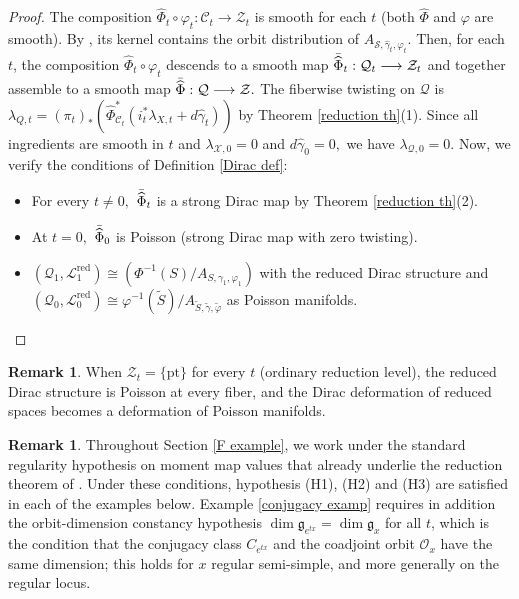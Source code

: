 \documentclass[reqno]{amsart}
\theoremstyle{plain}
\theoremstyle{definition}
\newtheorem{Rem}[Thm]{Remark}
\newcommand{\too}{\longrightarrow}
\newcommand{\C}{\mathcal{C}}
\renewcommand{\S}{\mathcal{S}}
\renewcommand{\L}{\mathcal{L}}
\newcommand{\Z}{\mathcal{Z}}
\newcommand{\X}{\mathcal{X}}
\newcommand{\Q}{\mathcal{Q}}
\begin{document}
\begin{proof}
The composition $\widehat{\Phi}_t \circ \varphi_t: \C_t \too \Z_t$ is smooth for each $t$ (both $\widehat{\Phi}$ and $\varphi$ are smooth). By \cite[]{bualibanu2026reduction}, its kernel contains the orbit distribution of $A_{\S,\widehat{\gamma}_t,\varphi_t}.$ Then, for each $t$, the composition $\widehat{\Phi}_t \circ \varphi_t$ descends to a smooth map $\Bar{\widehat{\Phi}}_t: \Q_t \too \Z_t$ and together assemble to a smooth map $\Bar{\widehat{\Phi}}: \Q \too \Z.$ 
The fiberwise twisting on $\Q$ is $\lambda_{Q,t} = (\pi_{t})_*(\widehat{\Phi}^{*}_{\C_t}(i_{t}^{*} \lambda_{X,t} + d\widehat{\gamma}_t))$ by Theorem \ref{reduction th}(1). Since all ingredients are smooth in $t$ and $\lambda_{\X,0} = 0$ and $d\widehat{\gamma}_0 = 0,$ we have $\lambda_{\Q,0} = 0.$ Now, we verify the conditions of Definition \ref{Dirac def}: \begin{itemize}
    \item For every $t\neq 0,$ $\Bar{\widehat{\Phi}}_t$ is a strong Dirac map by Theorem \ref{reduction th}(2). 
    \item At $t = 0,$ $\Bar{\widehat{\Phi}}_0$ is Poisson (strong Dirac map with zero twisting).
    \item $(\Q_1,\L^{\text{red}}_1) \cong (\Phi^{-1}(S)/A_{S,\gamma_1,\varphi_1})$ with the reduced Dirac structure and $(\Q_0,\L^{\text{red}}_0) \cong \varphi^{-1}(\widetilde{S})/A_{\widetilde{S},\tilde{\gamma},\tilde{\varphi}}$ as Poisson manifolds.
\end{itemize}
\end{proof}


\begin{Rem}
When $\Z_t = \{\text{pt}\}$ for every $t$ (ordinary reduction level), the reduced Dirac structure is Poisson at every fiber, and the Dirac deformation of reduced spaces becomes a deformation of Poisson manifolds. 
\end{Rem}

\begin{Rem}
    Throughout Section \ref{F example}, we work under the standard regularity hypothesis on moment map values that already underlie the reduction theorem of \cite[Section 2.1]{bualibanu2026reduction}. Under these conditions, hypothesis (H1), (H2) and (H3) are satisfied in each of the examples below. Example \ref{conjugacy examp} requires in addition the orbit-dimension constancy hypothesis
$\dim \mathfrak{g}_{e^{tx}} = \dim \mathfrak{g}_x$ for all $t$, which is the
condition that the conjugacy class $C_{e^{tx}}$ and the coadjoint orbit
$\mathcal{O}_x$ have the same dimension; this holds for $x$ regular semi-simple, and more generally on the regular locus.
\end{Rem}
\end{document}
